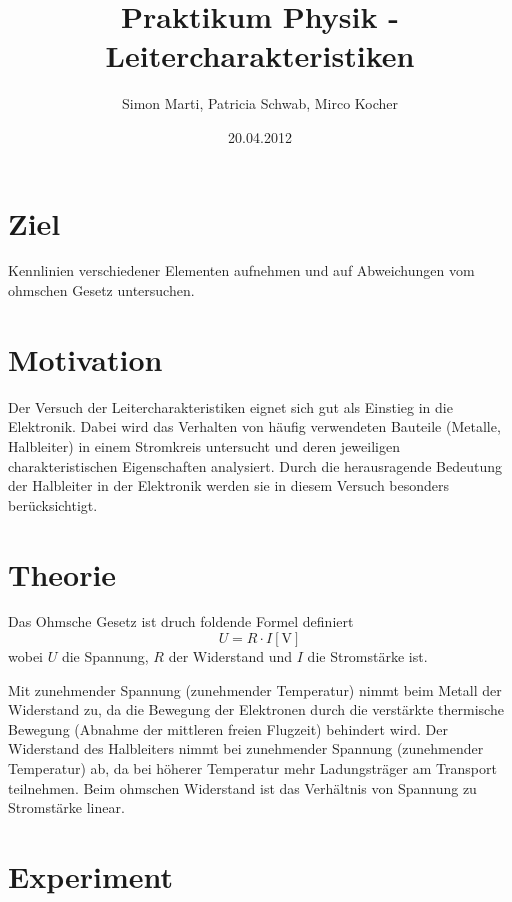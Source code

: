 \documentclass[12pt,a4paper]{article}
\title{Praktikum Physik - Leitercharakteristiken}
\author{Simon Marti, Patricia Schwab, Mirco Kocher}
\date{20.04.2012}
\begin{document}
\maketitle

\section*{Ziel}
Kennlinien verschiedener Elementen aufnehmen und auf Abweichungen vom ohmschen Gesetz untersuchen.

\section*{Motivation}
Der Versuch der Leitercharakteristiken eignet sich gut als Einstieg in die Elektronik. Dabei wird das Verhalten von h\"aufig verwendeten Bauteile (Metalle, Halbleiter) in einem Stromkreis untersucht und deren jeweiligen charakteristischen Eigenschaften analysiert. Durch die herausragende Bedeutung der Halbleiter in der Elektronik werden sie in diesem Versuch besonders ber\"ucksichtigt.

\section*{Theorie}
Das Ohmsche Gesetz ist druch foldende Formel definiert
\begin{equation}
U=R\cdot I [\mbox{V}]
\end{equation}
wobei $U$ die Spannung, $R$ der Widerstand und $I$ die Stromst\"arke ist. 


Mit zunehmender Spannung (zunehmender Temperatur) nimmt beim Metall der Widerstand zu, da die Bewegung der Elektronen durch die verst\"arkte thermische Bewegung (Abnahme der mittleren freien Flugzeit) behindert wird.
Der Widerstand des Halbleiters nimmt bei zunehmender Spannung (zunehmender Temperatur) ab, da bei h\"oherer Temperatur mehr Ladungstr\"ager am Transport teilnehmen.
Beim ohmschen Widerstand ist das Verh\"altnis von Spannung zu Stromst\"arke linear.

\section*{Experiment}
\end{document}
